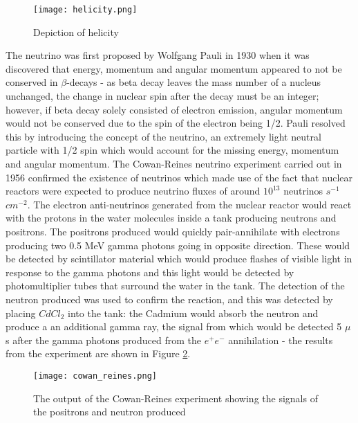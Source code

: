 \documentclass[11pt,oneside,a4paper]{article}
\begin{document}
\begin{figure}[htbp]
	\centering
	\texttt{[image: helicity.png]}
	\caption{Depiction of helicity}
	\label{fig:helicity}
\end{figure}

The neutrino was first proposed by Wolfgang Pauli \cite{neutrino1} in 1930 when it was discovered that energy, momentum and angular momentum appeared to not be conserved in $\beta$-decays - as beta decay leaves the mass number of a nucleus unchanged, the change in nuclear spin after the decay must be an integer; however, if beta decay solely consisted of electron emission, angular momentum would not be conserved due to the spin of the electron being 1/2. Pauli resolved this by introducing the concept of the neutrino, an extremely light neutral particle with 1/2 spin which would account for the missing energy, momentum and angular momentum. The Cowan-Reines neutrino experiment \cite{cowanreines} carried out in 1956 confirmed the existence of neutrinos which made use of the fact that nuclear reactors were expected to produce neutrino fluxes of around $10^{13}$ neutrinos $s^{-1}$ $cm^{-2}$. The electron anti-neutrinos generated from the nuclear reactor would react with the protons in the water molecules inside a tank producing neutrons and positrons. The positrons produced would quickly pair-annihilate with electrons producing two 0.5 MeV gamma photons going in opposite direction. These would be detected by scintillator material which would produce flashes of visible light in response to the gamma photons and this light would be detected by photomultiplier tubes that surround the water in the tank. The detection of the neutron produced was used to confirm the reaction, and this was detected by placing $CdCl_{2}$ into the tank: the Cadmium would absorb the neutron and produce a an additional gamma ray, the signal from which would be detected 5 $\mu$s after the gamma photons produced from the $e^{+}$$e^{-}$ annihilation - the results from the experiment are shown in Figure \ref{fig:cowan_reines}.

\begin{figure}[htbp]
	\centering
	\texttt{[image: cowan\_reines.png]}
	\caption{The output of the Cowan-Reines experiment showing the signals of the positrons and neutron produced}
	\label{fig:cowan_reines}
\end{figure}
\end{document}
